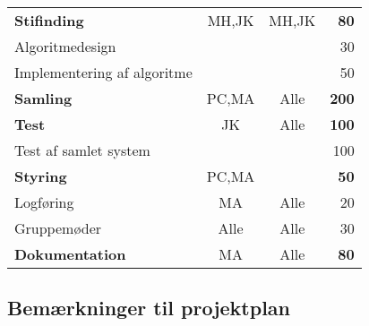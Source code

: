 \begin{center}
\begin{tabular}{l c c r}
	\hspace*{0.3cm} \textbf{Stifinding}							& MH,JK	& MH,JK	& \textbf{80}\\
	\hspace*{0.3cm}\hspace*{0.3cm} Algoritmedesign				&		&		& 30\\
	\hspace*{0.3cm}\hspace*{0.3cm} Implementering af algoritme	&		&		& 50\\
	\hspace*{0.3cm} \textbf{Samling}							& PC,MA	& Alle	& \textbf{200}\\
	\hspace*{0.3cm} \textbf{Test}								& 	JK	& Alle	& \textbf{100}\\
	\hspace*{0.3cm}\hspace*{0.3cm} Test af samlet system		&		&		& 100\\
	\hline
	\textbf{Styring}											& PC,MA	& 		& \textbf{50}\\
	\hspace*{0.3cm} Logføring									& MA	& Alle	& 20\\
	\hspace*{0.3cm} Gruppemøder									& Alle	& Alle	& 30\\
	\hline
	\textbf{Dokumentation}										& MA	& Alle & \textbf{80}
\end{tabular}
\end{center}

\subsection{Bemærkninger til projektplan}
